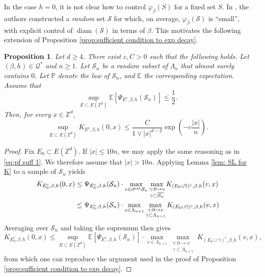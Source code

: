 \documentclass[11pt,a4paper]{article}
\numberwithin{equation}{section}
\theoremstyle{plain}
\newtheorem{Prop}[Thm]{Proposition}
\theoremstyle{definition}
\begin{document}
In the case $h=0$, it is not clear how to control $\varphi_\beta(S)$ for a fixed set $S$. In \cite{DuminilPanis2024newLB}, the authors constructed a \emph{random} set $\mathcal S$ for which, on average, $\varphi_\beta(\mathcal S)$ is ``small'', with explicit control of $\operatorname{diam}(\mathcal S)$ in terms of $\beta$. This motivates the following extension of Proposition \ref{prop:sufficient condition to exp decay}. 



\begin{Prop}\label{prop:sufficient condition to exp decay random} Let $d\geq 4$. There exist $c,C>0$ such that the following holds. Let $(\beta,h)\in \mathcal Q^*$ and $n \geq 1$. Let $\mathcal S_n$ be a random subset of $\Lambda_n$ that almost surely contains $0$. Let $\mathbb{P}$ denote the law of $\mathcal{S}_n$, and $\mathbb{E}$ the corresponding expectation. Assume that 
\begin{equation}\label{eq: random assumption to get exp decay}
	\sup_{E\subset E(\mathbb Z^d)}\mathbb E[\Psi_{E^c,\beta,h}(\mathcal S_n)]\leq \frac{1}{2}.
\end{equation}
Then, for every $x\in \mathbb Z^d$,
\begin{equation}
	\sup_{E\subset E(\mathbb Z^d)}K_{E^c,\beta,h}(0,x)\leq \frac{C}{1\vee |x|^{d-2}}\exp\left(-c\frac{|x|}{n}\right).
\end{equation}
\end{Prop}

\begin{proof} Fix $E_0\subset E(\mathbb Z^d)$. If $|x|\leq 10n$, we may apply the same reasoning as in \eqref{eq:pf suff 1}. We therefore assume that $|x|>10n$.  Applying Lemma \ref{lem: SL for K} to a sample of $\mathcal S_n$ yields
\begin{align}
\begin{aligned}
	K_{E_0^c,\beta,h}(0,x)&\leq \Psi_{E_0^c,\beta,h}(\mathcal S_n)\cdot \max_{v\in \partial^{\textup{ext}}\mathcal S_n}\max_{\substack{\gamma:0\rightarrow v\\\gamma\subset\overline{\mathcal S_n}}}K_{(E_0\cup\overline{\gamma})^c,\beta,h}(v,x)\\&\leq  \Psi_{E_0^c,\beta,h}(\mathcal S_n)\cdot \max_{v\in \Lambda_{n+1}}\max_{\substack{\gamma:0\rightarrow v\\\gamma\subset\Lambda_{n+1}}}K_{(E_0\cup\overline{\gamma})^c,\beta,h}(v,x)
	\end{aligned}
\end{align}
Averaging over $\mathcal S_n$ and taking the supremum then gives
\begin{equation}
	K_{E_0^c,\beta,h}(0,x)\leq \sup_{E\subset E(\mathbb Z^d)}\mathbb E[\Psi_{E^c,\beta,h}(\mathcal S_n)]\cdot \max_{v\in \Lambda_{n+1}}\max_{\substack{\gamma:0\rightarrow v\\\gamma\subset\Lambda_{n+1}}}K_{(E_0\cup\overline{\gamma})^c,\beta,h}(v,x),
\end{equation}
from which one can reproduce the argument used in the proof of Proposition \ref{prop:sufficient condition to exp decay}.
\end{proof}
\end{document}
